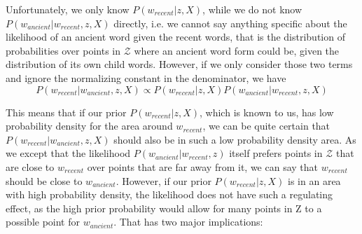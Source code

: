 \documentclass[6pt]{article}
\begin{document}
Unfortunately, we only know $P(w_{recent}|z,X)$, while we do not know $P(w_{ancient}|w_{recent},z,X)$ directly, i.e. we cannot say anything specific about the likelihood of an ancient word given the recent words, that is the distribution of probabilities over points in $\mathcal{Z}$ where an ancient word form could be, given the distribution of its own child words.
However, if we only consider those two terms and ignore the normalizing constant in the denominator, we have
\begin{equation}
P(w_{recent}|w_{ancient},z,X) \propto P(w_{recent}|z,X)P(w_{ancient}|w_{recent},z,X)
\end{equation}

This means that if our prior $P(w_{recent}|z,X)$, which is known to us, has low probability density for the area around $w_{recent}$, we can be quite certain that $P(w_{recent}|w_{ancient},z,X)$ should also be in such a low probability density area. As we except that the likelihood  $P(w_{ancient}|w_{recent},z)$ itself prefers points in $\mathcal{Z}$ that are close to $w_{recent}$ over points that are far away from it, we can say that $w_{recent}$ should be close to $w_{ancient}$. 
However, if our prior $P(w_{recent}|z,X)$ is in an area with high probability density, the likelihood does not have such a regulating effect, as the high prior probability would allow for many points in Z to a possible point for $w_{ancient}$. 
That has two major implications:
\end{document}
